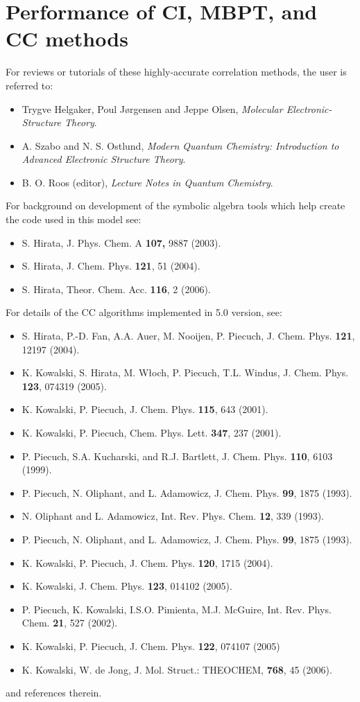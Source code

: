 \section{Performance of CI, MBPT, and CC methods}

For reviews or tutorials of these highly-accurate correlation methods, the user is referred to:
\begin{itemize}
\item Trygve Helgaker, Poul Jørgensen and Jeppe Olsen, \textit{Molecular Electronic-Structure Theory}.
\item A. Szabo and N. S. Ostlund, \textit{Modern Quantum Chemistry: Introduction to Advanced Electronic Structure Theory}.
\item B. O. Roos (editor), \textit{Lecture Notes in Quantum Chemistry}.
\end{itemize}

For background on development of the symbolic algebra tools which help create the code used in this model see:
\begin{itemize}
\item S. Hirata, J. Phys. Chem. A {\bf 107,} 9887 (2003).
\item S. Hirata, J. Chem. Phys. {\bf 121}, 51 (2004).
\item S. Hirata, Theor. Chem. Acc. {\bf 116}, 2 (2006).
\end{itemize}

For details of the CC algorithms implemented in 5.0 version, see:
\begin{itemize}
\item S. Hirata, P.-D. Fan, A.A. Auer, M. Nooijen, P. Piecuch, J. Chem. Phys.  {\bf 121}, 12197 (2004).
\item K. Kowalski, S. Hirata, M. W\l och, P. Piecuch, T.L. Windus, J. Chem. Phys. {\bf 123}, 074319 (2005).  
\item K. Kowalski, P. Piecuch, J. Chem. Phys.  {\bf 115}, 643 (2001).  
\item K. Kowalski, P. Piecuch, Chem. Phys. Lett. {\bf 347}, 237 (2001).  
\item P. Piecuch, S.A. Kucharski, and R.J. Bartlett, J. Chem. Phys. {\bf 110}, 6103 (1999).
\item P. Piecuch, N. Oliphant, and L. Adamowicz, J. Chem. Phys.  {\bf 99}, 1875 (1993).
\item N. Oliphant and L. Adamowicz, Int. Rev. Phys. Chem.  {\bf 12}, 339 (1993).
\item P. Piecuch, N. Oliphant, and L. Adamowicz, J. Chem. Phys.  {\bf 99}, 1875 (1993).
\item K. Kowalski, P. Piecuch, J. Chem. Phys. {\bf 120},  1715 (2004).
\item K. Kowalski, J. Chem. Phys. {\bf 123}, 014102 (2005).
\item P. Piecuch, K. Kowalski, I.S.O. Pimienta, M.J. McGuire, Int. Rev. Phys. Chem.  {\bf 21}, 527 (2002).
\item K. Kowalski, P. Piecuch, J. Chem. Phys. {\bf 122}, 074107 (2005)
\item K. Kowalski, W. de Jong, J. Mol. Struct.: THEOCHEM, {\bf 768}, 45 (2006).  
\end{itemize}
and references therein.

